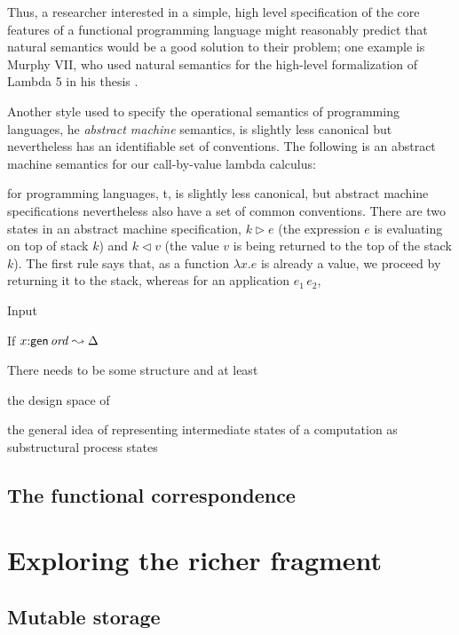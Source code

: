 Thus, a researcher interested in a simple, high level specification of
the core features of a functional programming language might
reasonably predict that natural semantics would be a good solution to
their problem; one example is Murphy VII, who used natural semantics
for the high-level formalization of Lambda 5 in his thesis
\cite{murphy08modal}.

Another style used to specify the operational semantics of programming
languages, he {\it abstract
  machine} semantics, is slightly less canonical but nevertheless has
an identifiable set of conventions. The following is an abstract 
machine semantics for our call-by-value lambda calculus:


 for programming languages, t, is slightly less canonical, but abstract machine
specifications nevertheless also have a set of common
conventions. There are two states in an abstract machine
specification, $k \rhd e$ (the expression $e$ is evaluating on top of
stack $k$) and $k \lhd v$ (the value $v$ is being returned to the top
of the stack $k$). The first rule says that, as a function $\lambda x.e$
is already a value, we proceed by returning it to the stack, whereas
for an application $e_1\,e_2$, 


Input


\begin{theorem}
If $x{:}{\sf gen}\,{{\it ord}} \leadsto \Delta$
\end{theorem}

There needs to be some structure and
at least


the design space
of 

 the general idea
of representing intermediate states of a computation as 
substructural process states 



\subsection{The functional correspondence}



\section{Exploring the richer fragment}
\label{sec:richer-ordered-abstract}

\subsection{Mutable storage}
\label{sec:mutable-storage}

